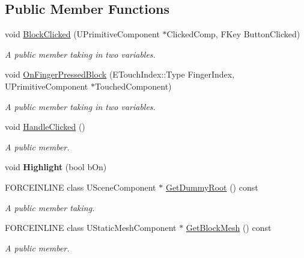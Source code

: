 \subsection*{Public Member Functions}
\begin{DoxyCompactItemize}
\item 
void \hyperlink{class_a_grid_block_a359898585d272e8d3ca0216f880d3d25}{Block\+Clicked} (U\+Primitive\+Component $\ast$Clicked\+Comp, F\+Key Button\+Clicked)
\begin{DoxyCompactList}\small\item\em A public member taking in two variables. \end{DoxyCompactList}\item 
void \hyperlink{class_a_grid_block_adb85baf2109b5a97d951b999b2890524}{On\+Finger\+Pressed\+Block} (E\+Touch\+Index\+::\+Type Finger\+Index, U\+Primitive\+Component $\ast$Touched\+Component)
\begin{DoxyCompactList}\small\item\em A public member taking in two variables. \end{DoxyCompactList}\item 
void \hyperlink{class_a_grid_block_aab961b92795d28c156b9a64bf4936e36}{Handle\+Clicked} ()
\begin{DoxyCompactList}\small\item\em A public member. \end{DoxyCompactList}\item 
\hypertarget{class_a_grid_block_a7f649750d4be151d29f98a7c5bc898ad}{}\label{class_a_grid_block_a7f649750d4be151d29f98a7c5bc898ad} 
void {\bfseries Highlight} (bool b\+On)
\item 
F\+O\+R\+C\+E\+I\+N\+L\+I\+NE class U\+Scene\+Component $\ast$ \hyperlink{class_a_grid_block_a666f4929d04306cbe30f437d8f9f94a4}{Get\+Dummy\+Root} () const
\begin{DoxyCompactList}\small\item\em A public member taking. \end{DoxyCompactList}\item 
F\+O\+R\+C\+E\+I\+N\+L\+I\+NE class U\+Static\+Mesh\+Component $\ast$ \hyperlink{class_a_grid_block_a88866015576480a21a82b9de762cfacf}{Get\+Block\+Mesh} () const
\begin{DoxyCompactList}\small\item\em A public member. \end{DoxyCompactList}\end{DoxyCompactItemize}
